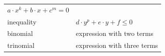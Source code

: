 {\begin{tabular}[t]{|l|l|}
                  $a\ensuremath{\cdot}{x}^{k}+b\ensuremath{\cdot}x+{c}^{m}=0$
     \tabularnewline\cline{1-1}\cline{2-2}
        inequality &
                  $d\ensuremath{\cdot}{y}^{p}+e\ensuremath{\cdot}y+f\le 0$
     \tabularnewline\cline{1-1}\cline{2-2}
        binomial &
        expression with two terms%
     \tabularnewline\cline{1-1}\cline{2-2}
        trinomial &
        expression with three terms%
     \tabularnewline\cline{1-1}\cline{2-2}
    \end{tabular}} %
